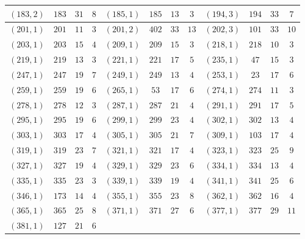 \documentclass[11pt,reqno]{amsart}
\theoremstyle{definition}
\begin{document}
{\begin{longtable}{|c|c|c|c||c|c|c|c||c|c|c|c|}
$ (
183 , 2 )$ & $
183 $ & $ 31 $ & $ 8 $
 & 
$ (
185 , 1 )$ & $
185 $ & $ 13 $ & $ 3 $
 & 
$ (
194 , 3 )$ & $
194 $ & $ 33 $ & $ 7 $
\\ \hline
$ (
201 , 1 )$ & $
201 $ & $ 11 $ & $ 3 $
 & 
$ (
201 , 2 )$ & $
402 $ & $ 33 $ & $ 13 $
 & 
$ (
202 , 3 )$ & $
101 $ & $ 33 $ & $ 10 $
\\ \hline
$ (
203 , 1 )$ & $
203 $ & $ 15 $ & $ 4 $
 & 
$ (
209 , 1 )$ & $
209 $ & $ 15 $ & $ 3 $
 & 
$ (
218 , 1 )$ & $
218 $ & $ 10 $ & $ 3 $
\\ \hline
$ (
219 , 1 )$ & $
219 $ & $ 13 $ & $ 3 $
 & 
$ (
221 , 1 )$ & $
221 $ & $ 17 $ & $ 5 $
 & 
$ (
235 , 1 )$ & $
47 $ & $ 15 $ & $ 3 $
\\ \hline
$ (
247 , 1 )$ & $
247 $ & $ 19 $ & $ 7 $
 & 
$ (
249 , 1 )$ & $
249 $ & $ 13 $ & $ 4 $
 & 
$ (
253 , 1 )$ & $
23 $ & $ 17 $ & $ 6 $
\\ \hline
$ (
259 , 1 )$ & $
259 $ & $ 19 $ & $ 6 $
 & 
$ (
265 , 1 )$ & $
53 $ & $ 17 $ & $ 6 $
 & 
$ (
274 , 1 )$ & $
274 $ & $ 11 $ & $ 3 $
\\ \hline
$ (
278 , 1 )$ & $
278 $ & $ 12 $ & $ 3 $
 & 
$ (
287 , 1 )$ & $
287 $ & $ 21 $ & $ 4 $
 & 
$ (
291 , 1 )$ & $
291 $ & $ 17 $ & $ 5 $
\\ \hline
$ (
295 , 1 )$ & $
295 $ & $ 19 $ & $ 6 $
 & 
$ (
299 , 1 )$ & $
299 $ & $ 23 $ & $ 4 $
 & 
$ (
302 , 1 )$ & $
302 $ & $ 13 $ & $ 4 $
\\ \hline
$ (
303 , 1 )$ & $
303 $ & $ 17 $ & $ 4 $
 & 
$ (
305 , 1 )$ & $
305 $ & $ 21 $ & $ 7 $
 & 
$ (
309 , 1 )$ & $
103 $ & $ 17 $ & $ 4 $
\\ \hline
$ (
319 , 1 )$ & $
319 $ & $ 23 $ & $ 7 $
 & 
$ (
321 , 1 )$ & $
321 $ & $ 17 $ & $ 4 $
 & 
$ (
323 , 1 )$ & $
323 $ & $ 25 $ & $ 9 $
\\ \hline
$ (
327 , 1 )$ & $
327 $ & $ 19 $ & $ 4 $
 & 
$ (
329 , 1 )$ & $
329 $ & $ 23 $ & $ 6 $
 & 
$ (
334 , 1 )$ & $
334 $ & $ 13 $ & $ 4 $
\\ \hline
$ (
335 , 1 )$ & $
335 $ & $ 23 $ & $ 3 $
 & 
$ (
339 , 1 )$ & $
339 $ & $ 19 $ & $ 4 $
 & 
$ (
341 , 1 )$ & $
341 $ & $ 25 $ & $ 6 $
\\ \hline
$ (
346 , 1 )$ & $
173 $ & $ 14 $ & $ 4 $
 & 
$ (
355 , 1 )$ & $
355 $ & $ 23 $ & $ 8 $
 & 
$ (
362 , 1 )$ & $
362 $ & $ 16 $ & $ 4 $
\\ \hline
$ (
365 , 1 )$ & $
365 $ & $ 25 $ & $ 8 $
 & 
$ (
371 , 1 )$ & $
371 $ & $ 27 $ & $ 6 $
 & 
$ (
377 , 1 )$ & $
377 $ & $ 29 $ & $ 11 $
\\ \hline
$ (
381 , 1 )$ & $
127 $ & $ 21 $ & $ 6 $

\end{longtable}}
\end{document}
